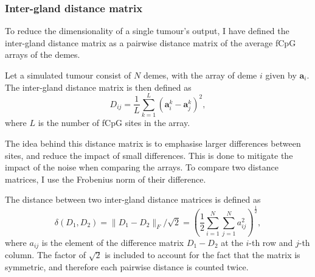 \subsubsection{Inter-gland distance matrix}
To reduce the dimensionality of a single tumour's output, I have defined the
inter-gland distance matrix as a pairwise distance matrix of the average fCpG
arrays of the demes.
\begin{definition}
    Let a simulated tumour consist of $N$ demes, with the array of deme $i$
    given by $\mathbf{a}_i$. The inter-gland distance matrix is then defined as
    \begin{equation}
        D_{ij} = \frac{1}{L}\sum_{k=1}^L(\mathbf{a}_{i}^k-\mathbf{a}_{j}^k)^2,
    \end{equation}
    where $L$ is the number of fCpG sites in the array.
\end{definition}
The idea behind this distance matrix is to emphasise larger differences between
sites, and reduce the impact of small differences. This is done to mitigate the
impact of the noise when comparing the arrays. To compare two distance matrices,
I use the Frobenius norm of their difference.
\begin{definition}
    The distance between two inter-gland distance matrices is defined as
    \begin{equation}
        \delta(D_1, D_2) = \lVert D_1 - D_2 \rVert_F/\sqrt{2} =
        \left(\frac{1}{2}\sum_{i=1}^N\sum_{j=1}^N
        a_{ij}^2\right)^{\frac{1}{2}},
    \end{equation}
    where $a_{ij}$ is the element of the difference matrix $D_1-D_2$ at the
    $i$-th row and $j$-th column. The factor of $\sqrt{2}$ is included to
    account for the fact that the matrix is symmetric, and therefore each
    pairwise distance is counted twice.
\end{definition}

